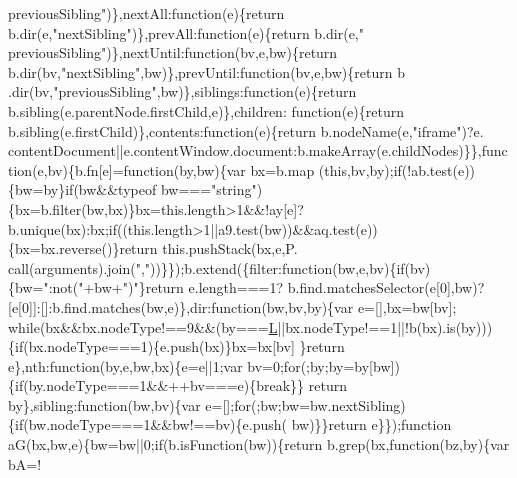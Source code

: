 \begin{DoxyCode}
{{      previousSibling"})\},nextAll:\textcolor{keyword}{function}(e)\{\textcolor{keywordflow}{return} b.dir(e,\textcolor{stringliteral}{"nextSibling"})\},prevAll:\textcolor{keyword}{function}(e)\{\textcolor{keywordflow}{return} b.dir(e,\textcolor{stringliteral}{"
      previousSibling"})\},nextUntil:\textcolor{keyword}{function}(bv,e,bw)\{\textcolor{keywordflow}{return} b.dir(bv,\textcolor{stringliteral}{"nextSibling"},bw)\},prevUntil:\textcolor{keyword}{function}(bv,e,bw)\{\textcolor{keywordflow}{return} b
      .dir(bv,\textcolor{stringliteral}{"previousSibling"},bw)\},siblings:\textcolor{keyword}{function}(e)\{\textcolor{keywordflow}{return} b.sibling(e.parentNode.firstChild,e)\},children:\textcolor{keyword}{
      function}(e)\{\textcolor{keywordflow}{return} b.sibling(e.firstChild)\},contents:\textcolor{keyword}{function}(e)\{\textcolor{keywordflow}{return} b.nodeName(e,\textcolor{stringliteral}{"iframe"})?e.
      contentDocument||e.contentWindow.document:b.makeArray(e.childNodes)\}\},\textcolor{keyword}{function}(e,bv)\{b.fn[e]=\textcolor{keyword}{function}(by,bw)\{var bx=b.map
      (\textcolor{keyword}{this},bv,by);\textcolor{keywordflow}{if}(!ab.test(e))\{bw=by\}\textcolor{keywordflow}{if}(bw&&typeof bw===\textcolor{stringliteral}{"string"})\{bx=b.filter(bw,bx)\}bx=this.length>1&&!ay[e]?
      b.unique(bx):bx;\textcolor{keywordflow}{if}((this.length>1||a9.test(bw))&&aq.test(e))\{bx=bx.reverse()\}\textcolor{keywordflow}{return} this.pushStack(bx,e,P.
      call(arguments).join(\textcolor{stringliteral}{","}))\}\});b.extend(\{filter:\textcolor{keyword}{function}(bw,e,bv)\{\textcolor{keywordflow}{if}(bv)\{bw=\textcolor{stringliteral}{":not("}+bw+\textcolor{stringliteral}{")"}\}\textcolor{keywordflow}{return} e.length===1?
      b.find.matchesSelector(e[0],bw)?[e[0]]:[]:b.find.matches(bw,e)\},dir:\textcolor{keyword}{function}(bw,bv,by)\{var e=[],bx=bw[bv];\textcolor{keywordflow}{
      while}(bx&&bx.nodeType!==9&&(by===\hyperlink{jquery_8js_a38ee4c0b5f4fe2a18d0c783af540d253}{L}||bx.nodeType!==1||!b(bx).is(by)))\{\textcolor{keywordflow}{if}(bx.nodeType===1)\{e.push(bx)\}bx=bx[bv]
      \}\textcolor{keywordflow}{return} e\},nth:\textcolor{keyword}{function}(by,e,bw,bx)\{e=e||1;var bv=0;\textcolor{keywordflow}{for}(;by;by=by[bw])\{\textcolor{keywordflow}{if}(by.nodeType===1&&++bv===e)\{\textcolor{keywordflow}{break}\}\}\textcolor{keywordflow}{
      return} by\},sibling:\textcolor{keyword}{function}(bw,bv)\{var e=[];\textcolor{keywordflow}{for}(;bw;bw=bw.nextSibling)\{\textcolor{keywordflow}{if}(bw.nodeType===1&&bw!==bv)\{e.push(
      bw)\}\}\textcolor{keywordflow}{return} e\}\});\textcolor{keyword}{function} aG(bx,bw,e)\{bw=bw||0;\textcolor{keywordflow}{if}(b.isFunction(bw))\{\textcolor{keywordflow}{return} b.grep(bx,\textcolor{keyword}{function}(bz,by)\{var bA=!
}
\end{DoxyCode}
